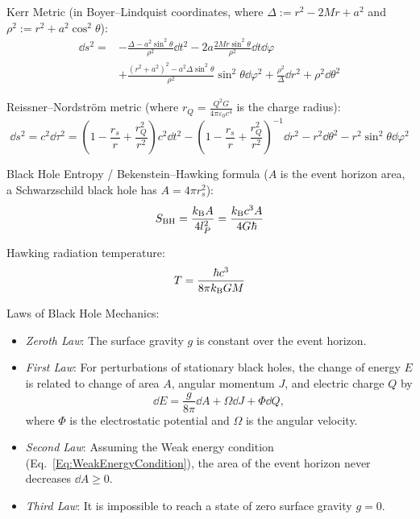 			\noindent
			Kerr Metric (in Boyer--Lindquist coordinates, where $\Delta:=r^2 - 2Mr + a^2$ and $\rho^2:=r^2+a^2\cos^2\theta$):
			\begin{equation}
				\begin{aligned}
					\dd s^2 =& - \frac{\Delta - a^2 \sin^2\theta}{\rho^2} \dd t^2 - 2a\frac{2Mr\sin^2\theta}{\rho^2}\dd t \dd \varphi \\
					&+ \frac{(r^2+a^2)^2 - a^2\Delta \sin^2\theta}{\rho^2}\sin^2\theta\dd\varphi^2 + \frac{\rho^2}{\Delta}\dd r^2 + \rho^2\dd\theta^2
				\end{aligned}
			\end{equation}

			\noindent
			Reissner--Nordström metric (where $r_Q = \frac{Q^2 G}{4\pi \varepsilon_0 c^4}$ is the charge radius):
			\begin{equation}
				\dd s^{2}=c^{2}\dd\tau ^{2}=\left(1-{\frac {r_s}{r}}+{\frac {r_Q^{2}}{r^{2}}}\right)c^{2}\dd t^{2}-\left(1-{\frac {r_s}{r}}+{\frac {r_Q^{2}}{r^{2}}}\right)^{-1}\dd r^{2}-r^{2}\dd\theta ^{2}-r^{2}\sin ^{2}\theta \dd\varphi ^{2}
			\end{equation}

			\noindent
			Black Hole Entropy / Bekenstein--Hawking formula ($A$ is the event horizon area, \eg a Schwarzschild black hole has $A=4\pi r_s^2$):
			\begin{equation}
				S_\mathrm{BH} = \frac{k_{\text{B}} A}{4 l_P^2}
				= \frac{k_{\text{B}} c^3 A}{4 G \hbar}
			\end{equation}

			\noindent
			Hawking radiation temperature:
			\begin{equation}
				T = \frac{\hbar c^3}{8\pi k_{\text{B}} G M}
			\end{equation}

			\noindent
			Laws of Black Hole Mechanics:
			\begin{itemize}
				\item \emph{Zeroth Law}: The surface gravity $g$ is constant over the event horizon.
				\item \emph{First Law}: For perturbations of stationary black holes, the change of energy $E$ is related to change of area $A$, angular momentum $J$, and electric charge $Q$ by
					\begin{equation}
						\dd E = \frac{g}{8\pi} \dd A + \Omega \dd J + \Phi \dd Q,
					\end{equation}
					where $\Phi$ is the electrostatic potential and $\Omega$ is the angular velocity.
				\item \emph{Second Law}: Assuming the Weak energy condition (Eq.~\ref{Eq:WeakEnergyCondition}), the area of the event horizon never decreases $\dd A \ge 0$.
				\item \emph{Third Law}: It is impossible to reach a state of zero surface gravity $g=0$.
			\end{itemize}

